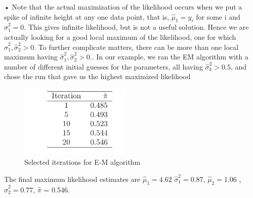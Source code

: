 \documentclass[11pt]{beamer}
\begin{document}
\begin{frame}{•}
Note that the actual maximization of the likelihood occurs when we put a
spike of infinite height at any one data point, that is, $\hat{\mu}_{1} = y_{i}$ for some
i and $\hat{\sigma}_{1}^2 = 0$. This gives infinite likelihood, but is not a useful solution.
Hence we are actually looking for a good local maximum of the likelihood,
one for which $\hat{\sigma}_{1}^2 , \hat{\sigma}_{2}^2 > 0.$ To further complicate matters, there can be
more than one local maximum having $\hat{\sigma}_{1}^2 , \hat{\sigma}_{2}^2 > 0.$. In our example, we
ran the EM algorithm with a number of different initial guesses for the
parameters, all having $\hat{\sigma}_{k}^2 > 0.5$, and chose the run that gave us the highest
maximized likelihood

\end{frame}
\begin{frame}
\begin{figure}
  
  \includegraphics[width=200]{fig4.jpg}
  
  \caption{Selected iterations for E-M algorithm}
  \label{fig:boat1}
\end{figure}
\textsf{The final maximum likelihood estimates are $\hat{\mu}_{1} = 4.62$                 $\hat{\sigma}_{1}^2 = 0.87$, $\hat{\mu}_{2} = 1.06 $ ,$\hat{\sigma}_{2}^2 = 0.77$, $\hat{\pi}$ = 0.546.}
\end{frame}
\end{document}
